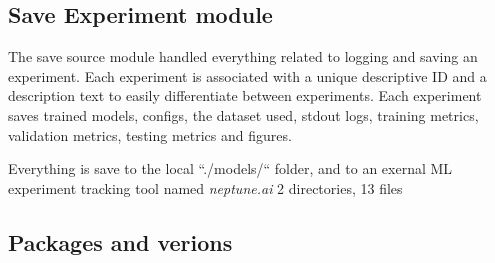 \iffalse
  The configuration module is to keep everything which is configurable and relevant
  for the experiment in one place. This helps keeping code changes down to a minumum,
  and it's easy to go back in time and check details of a ran experiment at a glans.

  The experiment pipeline contains multiple paramteres that can be adjusted and configured to alter the experiments.
  Configuration is done through the use of the ``config.yaml'' file defined in the project source code.
  This config file is used to configure the different aspects of the projects to be run.
  Ranging from the selected dataset and data files to be used, to the selected model and model structure, with model parameters and random seed.

  The config is parsed through at runtime reading the needed information when it becomes relevant.
  The file can be found in the source code at ``./config.yaml''.
  An example of a config is in the appendix at \Cref{cha:experiment-framework-example-config}.
\fi



\subsection{Save Experiment module}

The save source module handled everything related to logging and saving an experiment.
Each experiment is associated with a unique descriptive ID and a description text to easily
differentiate between experiments.
Each experiment saves trained models, configs, the dataset used, stdout logs, training metrics, validation metrics,
testing metrics and figures.

Everything is save to the local ``./models/`` folder, and to an exernal ML experiment tracking tool
named \textit{neptune.ai}
2 directories, 13 files

\subsection{Packages and verions}


